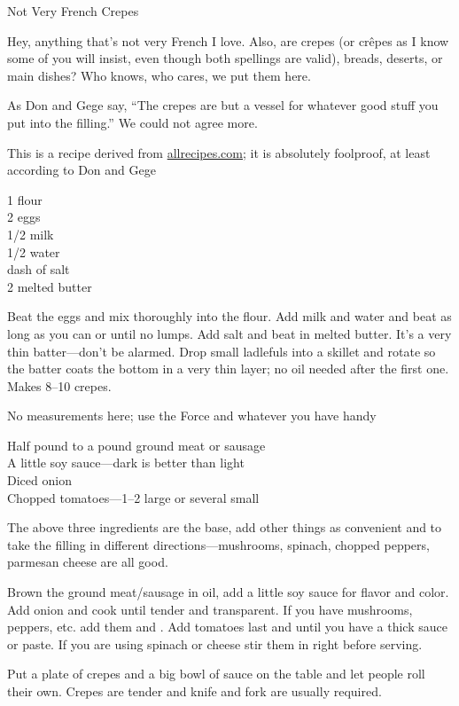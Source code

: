 
\begin{entry}{Not Very French Crepes}

\begin{open}
    Hey, anything that's not very French I love.  Also, are crepes (or
    cr\^{e}pes as I know some of you will insist, even though both spellings are
    valid), breads, deserts, or main dishes?  Who knows, who cares, we put them
    here.

    As Don and Gege say, ``The crepes are but a vessel for whatever good stuff
    you put into the filling.''  We could not agree more.

    This is a recipe derived from \url{allrecipes.com}; it is absolutely
    foolproof, at least according to Don and Gege
\end{open}
\begin{ingredients}
    \SI{1}{\cup} flour\\
    2 eggs\\
    \SI{1/2}{\cup} milk\\
    \SI{1/2}{\cup} water\\
    dash of salt\\
    \SI{2}{\tblspoon} melted butter
\end{ingredients}
Beat the eggs and mix thoroughly into the flour. Add milk and water and beat as
long as you can or until no lumps. Add salt and beat in melted butter. It's a
very thin batter---don't be alarmed. Drop small ladlefuls into a skillet and
rotate so the batter coats the bottom in a very thin layer; no oil needed after
the first one. Makes \numrange{8}{10} crepes.


\noindent No measurements here; use the Force and whatever you have handy
\begin{ingredients}
    Half pound to a pound ground meat or sausage\\
    A little soy sauce---dark is better than light\\
    Diced onion\\
    Chopped tomatoes---\numrange{1}{2} large or several small
\end{ingredients}
The above three ingredients are the base, add other things as convenient and
to take the filling in different directions---mushrooms, spinach, chopped
peppers, parmesan cheese are all good.

Brown the ground meat/sausage in oil, add a little soy sauce for flavor and
color. Add onion and cook until tender and transparent. If you have mushrooms,
peppers, etc. add them and \saute. Add tomatoes last and \saute until you
have a thick sauce or paste. If you are using spinach or cheese stir them in
right before serving.

Put a plate of crepes and a big bowl of sauce on the table and let people roll
their own. Crepes are tender and knife and fork are usually required.
\end{entry}

